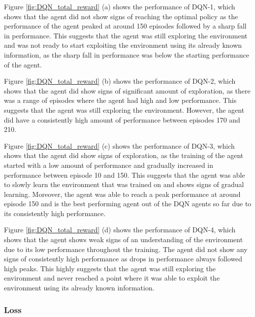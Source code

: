 Figure \ref{fig:DQN_total_reward} (a) shows the performance of DQN-1, which shows that the agent did not show signs of reaching the optimal policy as the performance of the agent peaked at around 150 episodes followed by a sharp fall in performance. This suggests that the agent was still exploring the environment and was not ready to start exploiting the environment using its already known information, as the sharp fall in performance was below the starting performance of the agent.

Figure \ref{fig:DQN_total_reward} (b) shows the performance of DQN-2, which shows that the agent did show signs of significant amount of exploration, as there was a range of episodes where the agent had high and low performance. This suggests that the agent was still exploring the environment. However, the agent did have a consistently high amount of performance between episodes 170 and 210.

Figure \ref{fig:DQN_total_reward} (c) shows the performance of DQN-3, which shows that the agent did show signs of exploration, as the training of the agent started with a low amount of performance and gradually increased in performance between episode 10 and 150. This suggests that the agent was able to slowly learn the environment that was trained on and shows signs of gradual learning. Moreover, the agent was able to reach a peak performance at around episode 150 and is the best performing agent out of the DQN agents so far due to its consistently high performance. 

Figure \ref{fig:DQN_total_reward} (d) shows the performance of DQN-4, which shows that the agent shows weak signs of an understanding of the environment due to its low performance throughout the training. The agent did not show any signs of consistently high performance as drops in performance always followed high peaks. This highly suggests that the agent was still exploring the environment and never reached a point where it was able to exploit the environment using its already known information.

\subsubsection*{Loss}

